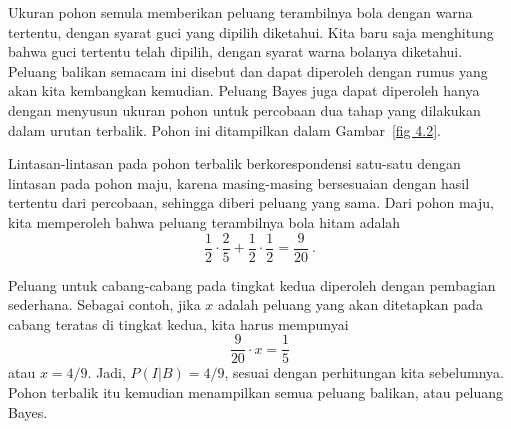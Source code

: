 Ukuran pohon semula memberikan peluang terambilnya bola dengan
warna tertentu, dengan syarat guci yang dipilih diketahui.  Kita baru saja menghitung  bahwa guci tertentu telah dipilih, dengan syarat warna bolanya diketahui. 
Peluang balikan semacam ini disebut  dan dapat diperoleh dengan rumus yang akan kita kembangkan
kemudian.  Peluang Bayes juga dapat diperoleh hanya dengan menyusun ukuran pohon untuk
percobaan dua tahap yang dilakukan dalam urutan terbalik.  Pohon ini ditampilkan dalam Gambar~\ref{fig 4.2}.


Lintasan-lintasan pada pohon terbalik berkorespondensi satu-satu dengan lintasan pada pohon maju,
karena masing-masing bersesuaian dengan hasil tertentu dari percobaan, sehingga diberi
peluang yang sama.  Dari pohon maju, kita memperoleh bahwa peluang terambilnya bola hitam adalah
$$
\frac 12 \cdot \frac 25 + \frac 12 \cdot \frac 12 = \frac 9{20}\ .
$$

Peluang untuk cabang-cabang pada tingkat kedua diperoleh dengan pembagian
sederhana.  Sebagai contoh, jika $x$ adalah peluang yang akan ditetapkan pada
cabang teratas di tingkat kedua, kita harus mempunyai
$$
\frac 9{20} \cdot x = \frac 15
$$
atau $x = 4/9$.  Jadi, $P(I|B) = 4/9$, sesuai dengan
perhitungan kita sebelumnya.  Pohon terbalik itu kemudian menampilkan semua peluang
balikan, atau peluang Bayes.  

